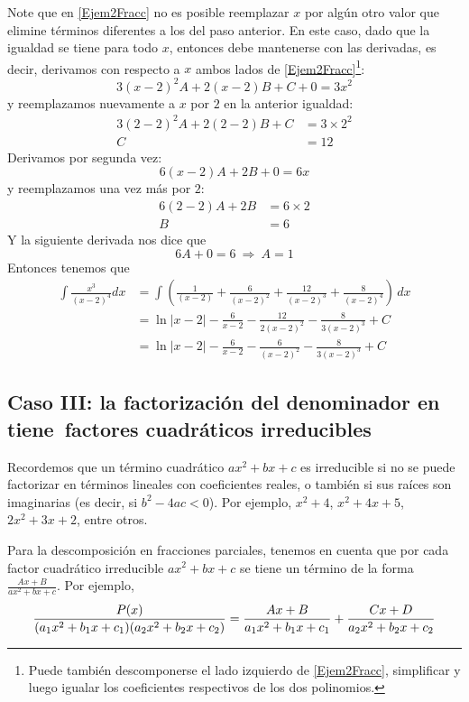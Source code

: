 Note que en \eqref{Ejem2Fracc} no es posible reemplazar $x$ por algún otro valor que elimine términos diferentes a los del paso anterior. En este caso, dado que la igualdad se tiene para todo $x$, entonces debe mantenerse con las derivadas, es decir, derivamos con respecto a $x$ ambos lados de \eqref{Ejem2Fracc}\footnote{ Puede también descomponerse el lado izquierdo de \eqref{Ejem2Fracc}, simplificar y luego igualar los coeficientes respectivos de los dos polinomios.}:\enlargethispage*{\baselineskip}
\[
  3(x-2)^{2}A+2(x-2)B+C+0=3x^2
\]
y reemplazamos nuevamente a $x$ por $2$ en la anterior igualdad:
\begin{align*}
  3(2-2)^{2}A+2(2-2)B+C&=3\times2^{2} \\
  C&=12
\end{align*}
Derivamos por segunda vez:
\[
  6(x-2)A+2B+0=6x
\]
y reemplazamos una vez más por $2$:
\begin{align*}
  6(2-2)A+2B&=6\times 2 \\
  B&=6
\end{align*}
Y la siguiente derivada nos dice que
\[
  6A+0=6\ \Rightarrow\ A=1
\]
Entonces tenemos que
\begin{align*}
  \int \frac{x^{3}}{(x-2)^{4}}dx&=\int\left( \frac{1}{(x-2)}+\frac{6}{(x-2)^{2}}+%
  \frac{12}{(x-2)^{3}}+\frac{8}{(x-2)^{4}}\right)\, dx\\
  &=\ln |x-2|-\frac{6}{x-2}-\frac{12}{2(x-2)^{2}}-\frac{8}{3(x-2)^{3}}+C\\
  &=\ln |x-2|-\frac{6}{x-2}-\frac{6}{(x-2)^{2}}-\frac{8}{3(x-2)^{3}}+C
\end{align*}

\subsection{Caso III: la factorización del denominador en \texorpdfstring{}{p(x)/q(x)} tiene~factores cuadráticos irreducibles}

Recordemos que un término cuadrático $ax^{2}+bx+c$ es irreducible si no se puede factorizar en términos lineales con coeficientes reales, o también si sus raíces son imaginarias (es decir, si $b^2-4ac<0$). Por ejemplo, $x^{2}+4$, $x^{2}+4x+5$, $2x^2+3x+2$, entre otros.

Para la descomposición en fracciones parciales, tenemos en cuenta que por cada factor cuadrático irreducible $ax^2+bx+c$ se tiene un término de la forma $\frac{Ax+B}{ax^2+bx+c}$. Por ejemplo,
\begin{gather*}
  \frac{P(x)}{(a_{1}x^{2}+b_{1}x+c_{1})(a_{2}x^{2}+b_{2}x+c_{2})}=\frac{Ax+B}{%
  a_{1}x^{2}+b_{1}x+c_{1}}+\frac{Cx+D}{a_{2}x^{2}+b_{2}x+c_{2}}
\end{gather*}


